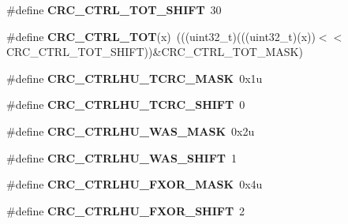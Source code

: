 \begin{DoxyCompactItemize}
\item 
\#define {\bfseries C\+R\+C\+\_\+\+C\+T\+R\+L\+\_\+\+T\+O\+T\+\_\+\+S\+H\+I\+FT}~30\hypertarget{group__CRC__Register__Masks_gaad1005ea5864ca6795a27b3f7db38ea6}{}\label{group__CRC__Register__Masks_gaad1005ea5864ca6795a27b3f7db38ea6}

\item 
\#define {\bfseries C\+R\+C\+\_\+\+C\+T\+R\+L\+\_\+\+T\+OT}(x)~(((uint32\+\_\+t)(((uint32\+\_\+t)(x))$<$$<$C\+R\+C\+\_\+\+C\+T\+R\+L\+\_\+\+T\+O\+T\+\_\+\+S\+H\+I\+FT))\&C\+R\+C\+\_\+\+C\+T\+R\+L\+\_\+\+T\+O\+T\+\_\+\+M\+A\+SK)\hypertarget{group__CRC__Register__Masks_gae8b301db96fe11408f82b997c5452bf7}{}\label{group__CRC__Register__Masks_gae8b301db96fe11408f82b997c5452bf7}

\item 
\#define {\bfseries C\+R\+C\+\_\+\+C\+T\+R\+L\+H\+U\+\_\+\+T\+C\+R\+C\+\_\+\+M\+A\+SK}~0x1u\hypertarget{group__CRC__Register__Masks_ga1d62eb284fb7d178fddaf03e10dcd19c}{}\label{group__CRC__Register__Masks_ga1d62eb284fb7d178fddaf03e10dcd19c}

\item 
\#define {\bfseries C\+R\+C\+\_\+\+C\+T\+R\+L\+H\+U\+\_\+\+T\+C\+R\+C\+\_\+\+S\+H\+I\+FT}~0\hypertarget{group__CRC__Register__Masks_ga9299763dd32745d443ab84a9911ad775}{}\label{group__CRC__Register__Masks_ga9299763dd32745d443ab84a9911ad775}

\item 
\#define {\bfseries C\+R\+C\+\_\+\+C\+T\+R\+L\+H\+U\+\_\+\+W\+A\+S\+\_\+\+M\+A\+SK}~0x2u\hypertarget{group__CRC__Register__Masks_ga9c716f81782ec7e214f823ef98fa8eb3}{}\label{group__CRC__Register__Masks_ga9c716f81782ec7e214f823ef98fa8eb3}

\item 
\#define {\bfseries C\+R\+C\+\_\+\+C\+T\+R\+L\+H\+U\+\_\+\+W\+A\+S\+\_\+\+S\+H\+I\+FT}~1\hypertarget{group__CRC__Register__Masks_gacd050b23263379193cf9cde3e1567ab1}{}\label{group__CRC__Register__Masks_gacd050b23263379193cf9cde3e1567ab1}

\item 
\#define {\bfseries C\+R\+C\+\_\+\+C\+T\+R\+L\+H\+U\+\_\+\+F\+X\+O\+R\+\_\+\+M\+A\+SK}~0x4u\hypertarget{group__CRC__Register__Masks_ga0a552f60712b28cd96e939d4324157df}{}\label{group__CRC__Register__Masks_ga0a552f60712b28cd96e939d4324157df}

\item 
\#define {\bfseries C\+R\+C\+\_\+\+C\+T\+R\+L\+H\+U\+\_\+\+F\+X\+O\+R\+\_\+\+S\+H\+I\+FT}~2\hypertarget{group__CRC__Register__Masks_ga505ca51d1aad1610b44bad4580f2637f}{}\label{group__CRC__Register__Masks_ga505ca51d1aad1610b44bad4580f2637f}


\end{DoxyCompactItemize}

